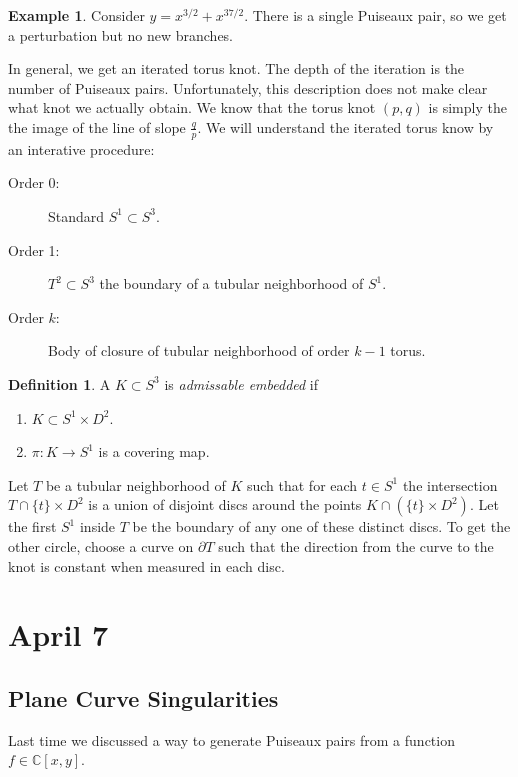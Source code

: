 \documentclass[leqno, openany]{memoir}
\theoremstyle{definition}
\newtheorem{defn}[thm]{Definition}
\newtheorem{exm}[thm]{Example}
\theoremstyle{remark}
\theoremstyle{plain}
\theoremstyle{definition}
\theoremstyle{remark}
\newcommand{\C}{\mathbb{C}}
\begin{document}
\begin{exm} Consider $y = x^{3/2} + x^{37/2}$. There is a single Puiseaux pair,
so we get a perturbation but no new branches.  \end{exm}

In general, we get an iterated torus knot. The depth of the iteration is the
number of Puiseaux pairs. Unfortunately, this description does not make clear
what knot we actually obtain. We know that the torus knot $(p,q)$ is simply the
the image of the line of slope $\frac{q}{p}$. We will understand the iterated
torus know by an interative procedure: \begin{description} \item[Order
    0:]Standard $S^1 \subset S^3$.  \item[Order 1:]$T^2 \subset S^3$ the
    boundary of a tubular neighborhood of $S^1$.  \item[Order $k$:]Body of
    closure of tubular neighborhood of order $k-1$ torus.  \end{description}
\begin{defn} A $K \subset S^3$ is \textit{admissable embedded} if
\begin{enumerate} \item $K \subset S^1 \times D^2$.  \item $\pi: K \to S^1$ is
a covering map.  \end{enumerate} \end{defn}

Let $T$ be a tubular neighborhood of $K$ such that for each $t \in S^1$ the
intersection $T \cap \{t \} \times D^2$ is a union of disjoint discs around the
points $K \cap (\{ t \} \times D^2)$. Let the first $S^1$ inside $T$ be the
boundary of any one of these distinct discs. To get the other circle, choose a
curve on $\partial T$ such that the direction from the curve to the knot is
constant when measured in each disc.

\chapter{April 7}%

\section{Plane Curve Singularities}%

Last time we discussed a way to generate Puiseaux pairs from a function $f \in
\C[x,y]$.
\end{document}
